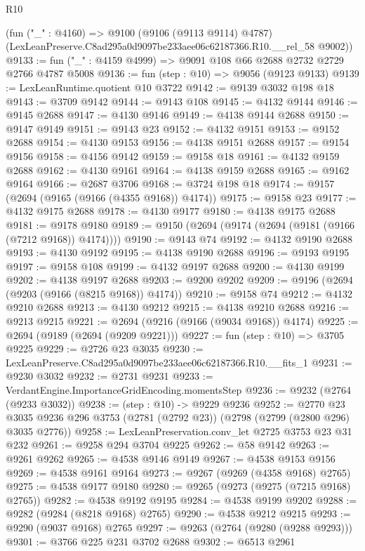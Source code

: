 \begin{lexlean}{R10}
\begin{coremodule}
    (fun ("_" : @4160) =>
    @9100
      (@9106 (@9113 @9114) @4787)
      (LexLeanPreserve.C8ad295a0d9097be233aee06c62187366.R10.__rel_58 @9002))
@9133 := fun ("_" : @4159 @4999) => @9091 @108 @66 @2688 @2732 @2729 @2766 @4787 @5008
@9136 := fun (step : @10) => @9056 (@9123 @9133)
@9139 := LexLeanRuntime.quotient @10 @3722
@9142 := @9139 @3032 @198 @18
@9143 := @3709 @9142
@9144 := @9143 @108
@9145 := @4132 @9144
@9146 := @9145 @2688
@9147 := @4130 @9146
@9149 := @4138 @9144 @2688
@9150 := @9147 @9149
@9151 := @9143 @23
@9152 := @4132 @9151
@9153 := @9152 @2688
@9154 := @4130 @9153
@9156 := @4138 @9151 @2688
@9157 := @9154 @9156
@9158 := @4156 @9142
@9159 := @9158 @18
@9161 := @4132 @9159 @2688
@9162 := @4130 @9161
@9164 := @4138 @9159 @2688
@9165 := @9162 @9164
@9166 := @2687 @3706
@9168 := @3724 @198 @18
@9174 := @9157 (@2694 (@9165 (@9166 (@4355 @9168)) @4174))
@9175 := @9158 @23
@9177 := @4132 @9175 @2688
@9178 := @4130 @9177
@9180 := @4138 @9175 @2688
@9181 := @9178 @9180
@9189 := @9150 (@2694 (@9174 (@2694 (@9181 (@9166 (@7212 @9168)) @4174))))
@9190 := @9143 @74
@9192 := @4132 @9190 @2688
@9193 := @4130 @9192
@9195 := @4138 @9190 @2688
@9196 := @9193 @9195
@9197 := @9158 @108
@9199 := @4132 @9197 @2688
@9200 := @4130 @9199
@9202 := @4138 @9197 @2688
@9203 := @9200 @9202
@9209 := @9196 (@2694 (@9203 (@9166 (@8215 @9168)) @4174))
@9210 := @9158 @74
@9212 := @4132 @9210 @2688
@9213 := @4130 @9212
@9215 := @4138 @9210 @2688
@9216 := @9213 @9215
@9221 := @2694 (@9216 (@9166 (@9034 @9168)) @4174)
@9225 := @2694 (@9189 (@2694 (@9209 @9221)))
@9227 := fun (step : @10) => @3705 @9225
@9229 := @2726 @23 @3035
@9230 := LexLeanPreserve.C8ad295a0d9097be233aee06c62187366.R10.__fits_1
@9231 := @9230 @3032
@9232 := @2731 @9231
@9233 := VerdantEngine.ImportanceGridEncoding.momentsStep
@9236 := @9232 (@2764 (@9233 @3032))
@9238 := (step : @10) -> @9229 @9236
@9252 := @2770
    @23
    @3035
    @9236
    @296
    @3753
    (@2781 (@2792 @23))
    (@2798 (@2799 (@2800 @296) @3035 @2776))
@9258 := LexLeanPreservation.conv_let @2725 @3753 @23 @31 @232
@9261 := @9258 @294 @3704 @9225
@9262 := @58 @9142
@9263 := @9261 @9262
@9265 := @4538 @9146 @9149
@9267 := @4538 @9153 @9156
@9269 := @4538 @9161 @9164
@9273 := @9267 (@9269 (@4358 @9168) @2765)
@9275 := @4538 @9177 @9180
@9280 := @9265 (@9273 (@9275 (@7215 @9168) @2765))
@9282 := @4538 @9192 @9195
@9284 := @4538 @9199 @9202
@9288 := @9282 (@9284 (@8218 @9168) @2765)
@9290 := @4538 @9212 @9215
@9293 := @9290 (@9037 @9168) @2765
@9297 := @9263 (@2764 (@9280 (@9288 @9293)))
@9301 := @3766 @225 @231 @3702 @2688
@9302 := @6513 @2961

\end{coremodule}
\end{lexlean}
